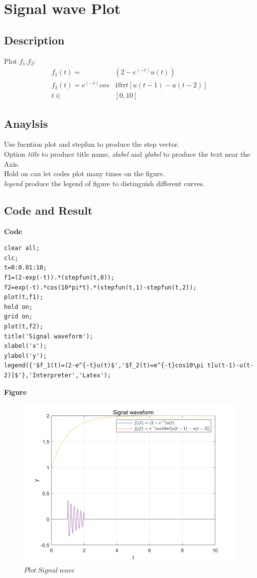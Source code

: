 \documentclass[UTF8,a4paper]{article}
\begin{document}
\section{Signal wave Plot}
\subsection{Description}
Plot $f_1$,$f_2$:
$$
\begin{aligned}
    f_1(t)=&(2-e^(-t)u(t))\\
    f_2(t)=e^(-t)cos&10\pi t[u(t-1)-u(t-2)]\\
    t \in &[0,10]
\end{aligned}
$$

\subsection{Anaylsis}
\noindent Use fucntion plot and stepfun to produce the step vector.\\
Option \textit{title} to produce title name, \textit{xlabel} and \textit{ylabel} to produce 
the text near the Axis.\\
Hold on can let codes plot many times on the figure.\\
\textit{legend} produce the legend of figure to distinguish different curves.
\subsection{Code and Result}
\textbf{Code}
\begin{lstlisting}
clear all;
clc;
t=0:0.01:10;
f1=(2-exp(-t)).*(stepfun(t,0));
f2=exp(-t).*cos(10*pi*t).*(stepfun(t,1)-stepfun(t,2));
plot(t,f1);
hold on;
grid on;
plot(t,f2);
title('Signal waveform');
xlabel('x');
ylabel('y');
legend({'$f_1(t)=(2-e^{-t}u(t)$','$f_2(t)=e^{-t}cos10\pi t[u(t-1)-u(t-2)]$'},'Interpreter','Latex');
\end{lstlisting}
\textbf{Figure}
\begin{figure}[h]
    \centering
    \includegraphics[width=1\textwidth]{T4-2.png}
    \caption{$Plot~Signal~wave$}
    \label{1}
\end{figure}
\end{document}
